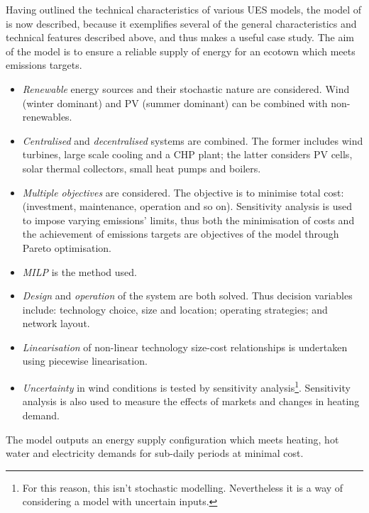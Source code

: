 Having outlined the technical characteristics of various UES models, the model of \citet{Weber2011} is now described, because it exemplifies several of the general characteristics and technical features described above, and thus makes a useful case study. The aim of the model is to ensure a reliable supply of energy for an ecotown which meets emissions targets.
\begin{itemize}
	\item \emph{Renewable} energy sources and their stochastic nature are considered. Wind (winter dominant) and PV (summer dominant) can be combined with non-renewables.
	\item \emph{Centralised} and \emph{decentralised} systems are combined. The former includes wind turbines, large scale cooling and a CHP plant; the latter considers PV cells, solar thermal  collectors, small heat pumps and boilers.
	\item \emph{Multiple objectives} are considered. The objective is to minimise total cost: (investment, maintenance, operation and so on). Sensitivity analysis is used to impose varying emissions' limits, thus both the minimisation of costs and the achievement of emissions targets are objectives of the model through Pareto optimisation.
	\item \emph{MILP} is the method used. 
	\item \emph{Design} and \emph{operation} of the system are both solved. Thus decision variables include: technology choice, size and location; operating strategies; and network layout.
	\item \emph{Linearisation} of non-linear technology size-cost relationships is undertaken using piecewise linearisation.
	\item \emph{Uncertainty} in wind conditions is tested by sensitivity analysis\footnote{For this reason, this isn't stochastic modelling. Nevertheless it is a way of considering a model with uncertain inputs.}. Sensitivity analysis is also used to measure the effects of markets and changes in heating demand.
\end{itemize}
The model outputs an energy supply configuration which meets heating, hot water and electricity demands for sub-daily periods at minimal cost.

